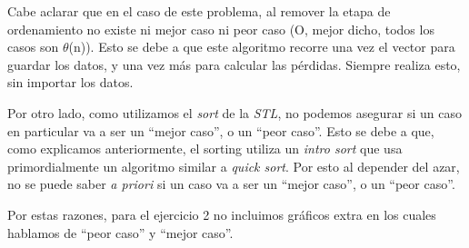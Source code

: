 Cabe aclarar que en el caso de este problema, al remover la etapa de ordenamiento no existe ni mejor caso ni peor caso (O, mejor dicho, todos los casos son $\theta$(n)). Esto se debe a que este algoritmo recorre una vez el vector para guardar los datos, y una vez más para calcular las pérdidas. Siempre realiza esto, sin importar los datos.

Por otro lado, como utilizamos el \emph{sort} de la \emph{STL}, no podemos asegurar si un caso en particular va a ser un ``mejor caso'', o un ``peor caso''. Esto se debe a que, como explicamos anteriormente, el sorting utiliza un \emph{intro sort} que usa primordialmente un algoritmo similar a \emph{quick sort}. Por esto al depender del azar, no se puede saber \emph{a priori} si un caso va a ser un ``mejor caso'', o un ``peor caso''.

Por estas razones, para el ejercicio 2 no incluimos gráficos extra en los cuales hablamos de ``peor caso'' y ``mejor caso''.